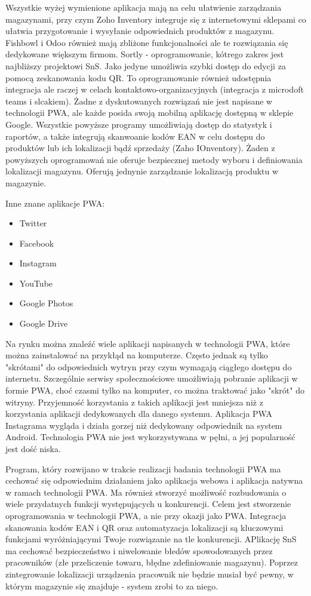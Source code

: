 \documentclass[../main.tex]{subfiles}
\begin{document}
Wszystkie wyżej wymienione aplikacja mają na celu ułatwienie zarządzania magazynami, przy czym Zoho Inventory integruje się z internetowymi sklepami co ułatwia przygotowanie i wysyłanie odpowiednich produktów z magazynu. Fishbowl i Odoo również mają zbliżone funkcjonalności ale te rozwiązania się dedykowane większym firmom. Sortly - oprogramowanie, kótrego zakres jest najbliższy projektowi SnS. Jako jedyne umożliwia szybki dostęp do edycji za pomocą zeskanowania kodu QR. To oprogramowanie również udostępnia integracja ale raczej w celach kontaktowo-organizacyjnych (integracja z microdoft teams i slcakiem). Żadne z dyskutowanych rozwiązań nie jest napisane w technologii PWA, ale każde posida swoją mobilną aplikację dostępną w sklepie Google. Wszystkie powyższe programy umożliwiają dostęp do statystyk i raportów, a także integrują skanwoanie kodów EAN w celu dostępu do produktów lub ich lokalizacji bądź sprzedaży (Zaho IOnventory). Żaden z powyższych oprogramowań nie oferuje bezpiecznej metody wyboru i definiowania lokalizacji magazynu. Oferują jednynie zarządzanie lokalizacją produktu w magazynie. %
  
Inne znane aplikacje PWA:
\begin{itemize}
    \item Twitter
    \item Facebook
    \item Instagram
    \item YouTube
    \item Google Photos
    \item Google Drive
\end{itemize}

Na rynku można znaleźć wiele aplikacji napisanych w technologii PWA, które można zainstalować na przykłąd na komputerze. Często jednak są tylko "skrótami" do odpowiednich wytryn przy czym wymagają ciągłego dostępu do internetu. Szczególnie serwisy społecznościowe umożliwiają pobranie aplikacji w formie PWA, choć czasmi tylko na komputer, co można traktować jako  "skrót" do witryny. Przyjemność korzystania z takich aplikacji jest mniejsza niż z korzystania aplikacji dedykowanych dla danego systemu. Aplikacja PWA Instagrama wygląda i działa gorzej niż dedykowany odpowiednik na system Android. Technologia PWA nie jest wykorzystywana w pęłni, a jej popularność jest dość niska. 

Program, który rozwijano w trakcie realizacji badania technologii PWA ma cechować się odpowiednim działaniem jako aplikacja webowa i aplikacja natywna w ramach technologii PWA. Ma również stworzyć możliwość rozbudowania o wiele przydatnych funkcji występujących u konkurencji. Celem jest stworzenie oprogramowania w technologii PWA, a nie przy okazji jako PWA.  Integracja skanowania kodów EAN i QR oraz automatyzacja lokalizacji są kluczowymi funkcjami wyróżniającymi Twoje rozwiązanie na tle konkurencji. APlikację SnS ma cechować bezpieczeństwo i niwelowanie błedów spowodowanych przez pracowników (złe przeliczenie towaru, błędne zdefiniowanie magazynu). Poprzez zintegrowanie lokalizacji urządzenia pracownik nie będzie musiał być pewny, w którym magazynie się znajduje - system zrobi to za niego. 
\end{document}
